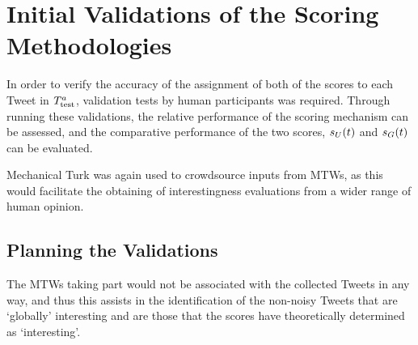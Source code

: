 %
%



\section{Initial Validations of the Scoring Methodologies}
In order to verify the accuracy of the assignment of both of the scores to each Tweet in $T^a_{\textrm{test}}{}$, validation tests by human participants was required. Through running these validations, the relative performance of the scoring mechanism can be assessed, and the comparative performance of the two scores, $s_U(t)$ and $s_G(t)$ can be evaluated.

Mechanical Turk was again used to crowdsource inputs from MTWs, as this would facilitate the obtaining of interestingness evaluations from a wider range of human opinion.


\subsection{Planning the Validations}
The MTWs taking part would not be associated with the collected Tweets in any way, and thus this assists in the identification of the non-noisy Tweets that are `globally' interesting and are those that the scores have theoretically determined as `interesting'.

